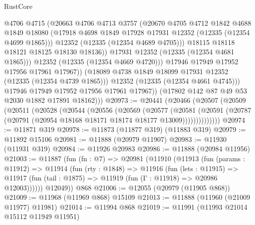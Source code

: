 \begin{lexlean}{RustCore}
\begin{coremodule}
                        @4706
                        @4715
                        (@20663
                          @4706
                          @4713
                          @3757
                          (@20670
                            @4705
                            @4712
                            @1842
                            @4688
                            @1849
                            @18080
                            (@17918 @4698 @1849 @17928 @17931 @12352 (@12335 (@12354 @4699 @1865)))
                            @12352
                            (@12335 (@12354 @4689 @4705)))
                          @18115
                          @18118
                          @18121
                          @18125
                          @18130
                          @18136))
                      @17931
                      @12352
                      (@12335 (@12354 @4681 @1865)))
                    @12352
                    (@12335 (@12354 @4669 @4720)))
                  @17946
                  @17949
                  @17952
                  @17956
                  @17961
                  @17967))
              (@18089 @4738 @1849 @18099 @17931 @12352 (@12335 (@12354 @4739 @1865)))
              @12352
              (@12335 (@12354 @4661 @4745)))
            @17946
            @17949
            @17952
            @17956
            @17961
            @17967))
        (@17802 @142 @87 @49 @53 @2030 @1882 @17891 @18162)))
@20973 := @20441
    (@20466
      (@20507
        (@20509
          (@20511
            (@20528
              (@20544
                (@20556
                  (@20569
                    (@20577
                      (@20581
                        (@20591
                          (@20787 (@20791 (@20954 @18168 @18171 @18174 @18177 @13009))))))))))))))
@20974 := @11871 @319
@20978 := @11873 (@11877 @319) (@11883 @319)
@20979 := @11892 @15106
@20981 := @11888 (@20979 @11907)
@20983 := @11930 (@11931 @319)
@20984 := @11926 @20983
@20986 := @11888 (@20984 @11956)
@21003 := @11887
    (fun (fn : @7) =>
    @20981
      (@11910
        (@11913
          (fun (params : @11912) =>
          @11914
            (fun (rty : @1848) =>
            @11916
              (fun (lets : @11915) =>
              @11917 (fun (tail : @1875) => @11919 (fun (Γ : @11918) => @20986 @12003))))))
        @12049))
    @868
@21006 := @12055 (@20979 (@11905 @868))
@21009 := @11968 (@11969 @868) @15109
@21013 := @11888 (@11960 (@21009 @11977) @11981)
@21014 := @11994 @868
@21019 := @11991 (@11993 @21014 @15112 @11949 @11951)

\end{coremodule}
\end{lexlean}
